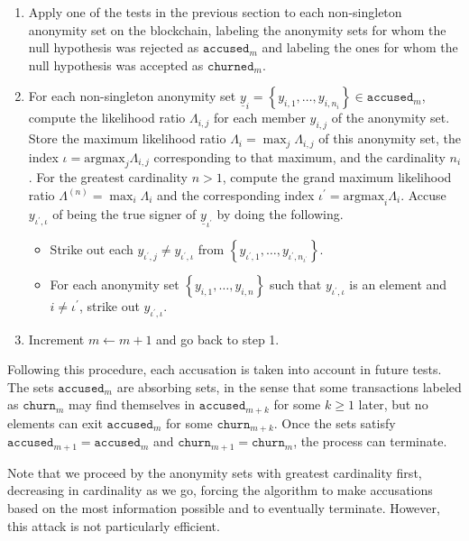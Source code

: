 \documentclass{tran-l}
\theoremstyle{cor}
\theoremstyle{definition}
\theoremstyle{remark}
\theoremstyle{conjecture}
\numberwithin{equation}{section}
\begin{document}
\begin{enumerate}
\item Apply one of the tests in the previous section to each non-singleton anonymity set on the blockchain, labeling the anonymity sets for whom the null hypothesis was rejected as $\texttt{accused}_m$ and labeling the ones for whom the null hypothesis was accepted as $\texttt{churned}_m$.
\item For each non-singleton anonymity set $\underline{y}_i = \left\{y_{i,1}, \ldots, y_{i, n_i}\right\} \in \texttt{accused}_m$, compute the likelihood ratio $\Lambda_{i,j}$ for each member $y_{i,j}$ of the anonymity set. Store the maximum likelihood ratio $\Lambda_i = \max_j \Lambda_{i,j}$ of this anonymity set, the index $\iota = \text{argmax}_j \Lambda_{i,j}$ corresponding to that maximum, and the cardinality $n_i$.
For the greatest cardinality $n > 1$, compute the grand maximum likelihood ratio $\Lambda^{(n)} = \max_i \Lambda_i$ and the corresponding index $\iota^\prime = \text{argmax}_i \Lambda_i$.
Accuse $y_{\iota^\prime, \iota}$ of being the true signer of $\underline{y}_{\iota^\prime}$ by doing the following.
\begin{itemize}
\item Strike out each $y_{\iota^\prime, j} \neq y_{\iota^\prime, \iota}$ from $\left\{y_{\iota^\prime, 1}, \ldots, y_{\iota^\prime, n_{\iota^\prime}}\right\}$.
\item For each anonymity set $\left\{y_{i,1}, \ldots, y_{i,n}\right\}$ such that $y_{\iota^\prime, \iota}$ is an element and $i \neq \iota^\prime$, strike out $y_{\iota^\prime, \iota}$.
\end{itemize}
\item Increment $m \leftarrow m+1$ and go back to step 1.
\end{enumerate}

Following this procedure, each accusation is taken into account in future tests.
The sets $\texttt{accused}_m$ are absorbing sets, in the sense that some transactions labeled as $\texttt{churn}_m$ may find themselves in $\texttt{accused}_{m+k}$ for some $k \geq 1$ later, but no elements can exit $\texttt{accused}_m$ for some $\texttt{churn}_{m+k}$.
Once the sets satisfy $\texttt{accused}_{m+1} = \texttt{accused}_m$ and $\texttt{churn}_{m+1} = \texttt{churn}_m$, the process can terminate.

Note that we proceed by the anonymity sets with greatest cardinality first, decreasing in cardinality as we go, forcing the algorithm to make accusations based on the most information possible and to eventually terminate.
However, this attack is not particularly efficient.
\end{document}
